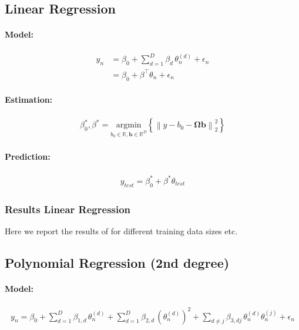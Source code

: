 \documentclass[a4paper, 12pt]{article}
\newcommand{\norm}[1]{\left\lVert#1\right\rVert}
\begin{document}
\subsection{Linear Regression}

\paragraph{Model:}
\begin{align}\label{eq:linear_model}
  y_n &= \beta_0 + \sum_{d = 1}^D \beta_d \, \theta_n^{(d)} + \epsilon_n\\
      &= \beta_0 + \beta^\top \theta_n + \epsilon_n
\end{align}

\paragraph{Estimation:}

\begin{align}
  \beta_0^*, \beta^* = \underset{b_0 \in \mathbb{R}, \bm{b} \in \mathbb{R}^D}{\text{argmin}} \left\{  \norm{y - b_0 - \bm{\Omega} \bm{b}}_2^2 \right \}
\end{align}

\paragraph{Prediction:}
\begin{align}\label{eq:linear_prediction}
y_{test} = \beta_0^* + \beta^* \theta_{test}
\end{align}

\subsubsection{Results Linear Regression}

Here we report the results of for different training data sizes etc. %

\subsection{Polynomial Regression (2nd degree)}

\paragraph{Model:}
\begin{align}\label{eq:polynomial_model} y_n = \beta_0 + \sum_{d=1}^D \beta_{1,d} \, \theta_n^{(d)} + \sum_{d=1}^D \beta_{2,d} \, (\theta_n^{(d)})^2 + \sum_{d\neq j} \beta_{3,dj} \, \theta_n^{(d)} \theta_n^{(j)} + \epsilon_n
\end{align}
\end{document}
